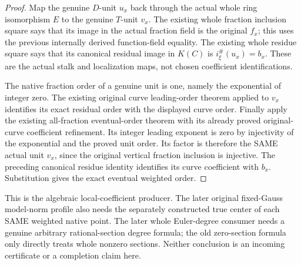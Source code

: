 \begin{proof}
Map the genuine $D$-unit $u_x$ back through the actual whole ring isomorphism
$E$ to the genuine $T$-unit $v_x$. The existing whole fraction inclusion square
says that its image in the actual fraction field is the original $f_x$;
this uses the previous internally derived function-field equality. The
existing whole residue square says that its canonical residual image in
$K(C)$ is $i_\xi^\#(u_x)=b_x$. These are the actual stalk and localization
maps, not chosen coefficient identifications.

The native fraction order of a genuine unit is one, namely the exponential
of integer zero. The existing original curve leading-order theorem applied
to $v_x$ identifies its exact residual order with the displayed curve order.
Finally apply the existing all-fraction eventual-order theorem with its
already proved original-curve coefficient refinement. Its integer leading
exponent is zero by injectivity of the exponential and the proved unit order.
Its factor is therefore the SAME actual unit $v_x$, since the original
vertical fraction inclusion is injective. The preceding canonical residue
identity identifies its curve coefficient with $b_x$. Substitution gives
the exact eventual weighted order.
\end{proof}

This is the algebraic local-coefficient producer. The later original
fixed-Gauss model-norm profile also needs the separately constructed true
center of each SAME weighted native point. The later whole Euler-degree
consumer needs a genuine arbitrary rational-section degree formula; the
old zero-section formula only directly treats whole nonzero sections.
Neither conclusion is an incoming certificate or a completion claim here.

